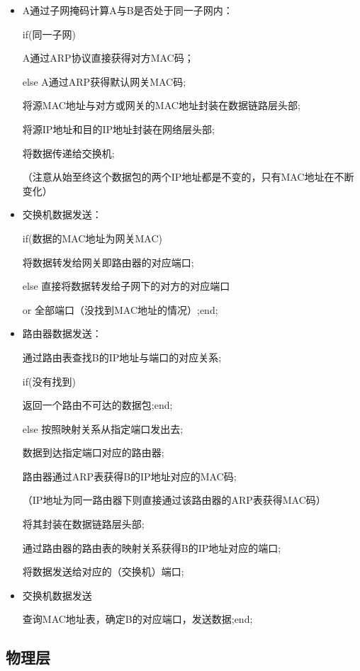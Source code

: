 \documentclass[UTF8]{article}%
\begin{document}
\begin{itemize}
    \item A通过子网掩码计算A与B是否处于同一子网内：
    
    if(同一子网)  

        \qquad A通过ARP协议直接获得对方MAC码；

    else \quad A通过ARP获得默认网关MAC码;
        

        将源MAC地址与对方或网关的MAC地址封装在数据链路层头部;

        将源IP地址和目的IP地址封装在网络层头部;

        将数据传递给交换机; 

        （注意从始至终这个数据包的两个IP地址都是不变的，只有MAC地址在不断变化）

    \item 交换机数据发送：
    
    if(数据的MAC地址为网关MAC) 
        
    \qquad 将数据转发给网关即路由器的对应端口;
    
    else \quad 直接将数据转发给子网下的对方的对应端口
         
         \qquad or 全部端口（没找到MAC地址的情况）;end;

    \item 路由器数据发送：
    
    通过路由表查找B的IP地址与端口的对应关系;

    if(没有找到)
    
    \qquad 返回一个路由不可达的数据包;end;

    else \quad 按照映射关系从指定端口发出去;

    数据到达指定端口对应的路由器;
    
    路由器通过ARP表获得B的IP地址对应的MAC码;

    （IP地址为同一路由器下则直接通过该路由器的ARP表获得MAC码）

    将其封装在数据链路层头部;

    通过路由器的路由表的映射关系获得B的IP地址对应的端口;
    
    将数据发送给对应的（交换机）端口;

    \item 交换机数据发送
    
    查询MAC地址表，确定B的对应端口，发送数据;end;

\end{itemize}

\subsection{物理层}
\end{document}
